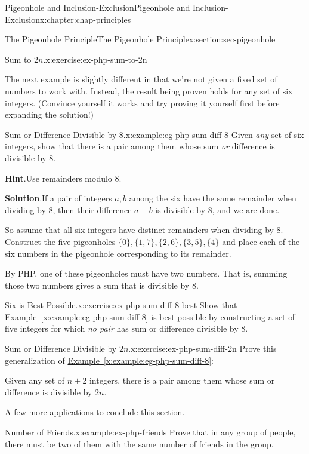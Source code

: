 \documentclass[oneside,10pt,]{book}
\newcommand{\blocktitlefont}{\relax}
\newcommand{\xreffont}{\relax}
\numberwithin{equation}{section}
\begin{document}
\begin{chapterptx}{Pigeonhole and Inclusion-Exclusion}{}{Pigeonhole and Inclusion-Exclusion}{}{}{x:chapter:chap-principles}
\begin{sectionptx}{The Pigeonhole Principle}{}{The Pigeonhole Principle}{}{}{x:section:sec-pigeonhole}
\begin{inlineexercise}{Sum to \(2n\).}{x:exercise:ex-php-sum-to-2n}
\end{inlineexercise}
The next example is slightly different in that we're not given a fixed set of numbers to work with. Instead, the result being proven holds for any set of six integers. (Convince yourself it works and try proving it yourself first before expanding the solution!)%
\begin{example}{Sum or Difference Divisible by 8.}{x:example:eg-php-sum-diff-8}%
Given \emph{any} set of six integers, show that there is a pair among them whose sum \emph{or} difference is divisible by 8.%
\par\smallskip%
\noindent\textbf{\blocktitlefont Hint}.\hypertarget{g:hint:id265790}{}\quad{}Use remainders modulo 8.%
\par\smallskip%
\noindent\textbf{\blocktitlefont Solution}.\hypertarget{g:solution:id265823}{}\quad{}If a pair of integers \(a, b\) among the six have the same remainder when dividing by 8, then their difference \(a-b\) is divisible by 8, and we are done.%
\par
So assume that all six integers have distinct remainders when dividing by 8. Construct the five pigeonholes \(\{0\},\{1,7\},\{2,6\},\{3,5\},\{4\}\) and place each of the six numbers in the pigeonhole corresponding to its remainder.%
\par
By PHP, one of these pigeonholes must have two numbers. That is, summing those two numbers gives a sum that is divisible by 8.%
\end{example}
\begin{inlineexercise}{Six is Best Possible.}{x:exercise:ex-php-sum-diff-8-best}%
Show that \hyperref[x:example:eg-php-sum-diff-8]{Example~{\xreffont\ref{x:example:eg-php-sum-diff-8}}} is best possible by constructing a set of five integers for which \emph{no pair} has sum or difference divisible by 8.%
\end{inlineexercise}
\begin{inlineexercise}{Sum or Difference Divisible by \(2n\).}{x:exercise:ex-php-sum-diff-2n}%
Prove this generalization of \hyperref[x:example:eg-php-sum-diff-8]{Example~{\xreffont\ref{x:example:eg-php-sum-diff-8}}}:%
\par
Given any set of \(n+2\) integers, there is a pair among them whose sum or difference is divisible by \(2n\).%
\end{inlineexercise}
A few more applications to conclude this section.%
\begin{example}{Number of Friends.}{x:example:ex-php-friends}%
Prove that in any group of people, there must be two of them with the same number of friends in the group.%

\end{example}
\end{sectionptx}
\end{chapterptx}
\end{document}
